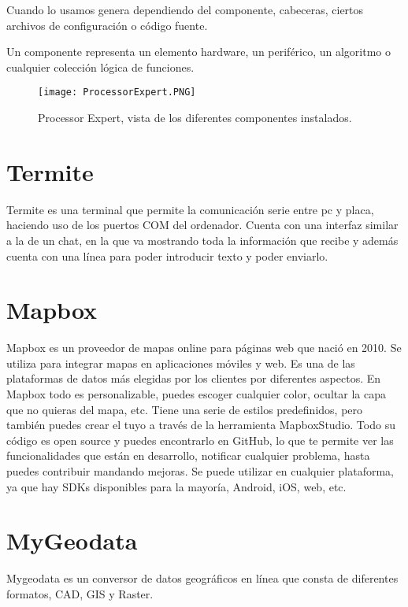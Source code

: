 Cuando lo usamos genera dependiendo del componente, cabeceras, ciertos archivos de configuración o código fuente.

Un componente representa un elemento hardware, un periférico, un algoritmo o cualquier colección lógica de funciones.
\begin{figure}[!h]
	\centering
	\texttt{[image: ProcessorExpert.PNG]}
	\caption{Processor Expert, vista de los diferentes componentes instalados.}\label{fig:ProcessorExpert.PNG}
\end{figure}
\FloatBarrier

\section{Termite}
Termite \cite{termite} es una terminal que permite la comunicación serie entre pc y placa, haciendo uso de los puertos COM del ordenador. Cuenta con una interfaz similar a la de un chat, en la que va mostrando toda la información que recibe y además cuenta con una línea para poder introducir texto y poder enviarlo.


\section{Mapbox}
Mapbox \cite{mapbox} es un proveedor de mapas online para páginas web que nació en 2010. Se utiliza para integrar mapas en aplicaciones móviles y web.
Es una de las plataformas de datos más elegidas por los clientes por diferentes aspectos.
En Mapbox todo es personalizable, puedes escoger cualquier color, ocultar la capa que no quieras del mapa, etc. Tiene una serie de estilos predefinidos, pero también puedes crear el tuyo a través de la herramienta MapboxStudio.
Todo su código es open source y puedes encontrarlo en GitHub, lo que te permite ver las funcionalidades que están en desarrollo, notificar cualquier problema, hasta puedes contribuir mandando mejoras.
Se puede utilizar en cualquier plataforma, ya que hay SDKs disponibles para la mayoría, Android, iOS, web, etc.

\section{MyGeodata}
Mygeodata \cite{mygeodata} es un conversor de datos geográficos en línea que consta de diferentes formatos, CAD, GIS y Raster.

